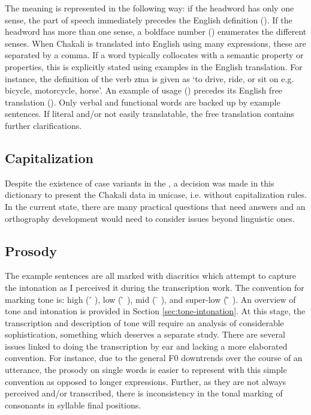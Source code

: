 The meaning  is represented in the following way: if the headword has only one sense,  the part of speech immediately precedes the English definition ().  If the headword has more than one sense,  a boldface number () enumerates the different senses. When Chakali is translated into English using many expressions, these are separated by a comma. If a word typically collocates with a semantic property or properties, this is explicitly stated using examples in the English translation.  For instance, the definition of the verb {\sls zɪna} is given  as   `to drive, ride, or sit on e.g. bicycle, motorcycle, horse'.  An example of usage () precedes its English free translation (). Only verbal and functional words  are backed up by example sentences.  If literal and/or not easily translatable, the free translation contains further clarifications.


\subsection{Capitalization}
\label{sec:capitalization}

Despite the existence of case variants in the , a decision was made in this dictionary to present the Chakali data in unicase, i.e. without capitalization rules.  In the current state, there are many practical questions that need answers and an orthography development would need to consider issues beyond linguistic ones.

\subsection{Prosody}
\label{sec:INT-prosody}

The example sentences are all marked with diacritics which attempt to capture the intonation as I perceived it during the transcription work. The convention for marking tone is:  high (    ́   ), low (    ̀  ), mid   (  ̄  ),  and super-low ( ̏  ).   An overview of tone and intonation is provided in Section \ref{sec:tone-intonation}. At this stage, the transcription and description of tone will require an analysis of considerable sophistication, something which deserves a separate study. There are several issues linked to doing the transcription by ear and lacking a more elaborated convention. For instance, due to the general F0 downtrends over the course of an utterance,  the prosody on single words is easier to represent with this simple convention as opposed  to longer expressions. Further, as they are  not always perceived and/or transcribed, there is inconsistency in the tonal marking of consonants in syllable final positions.

